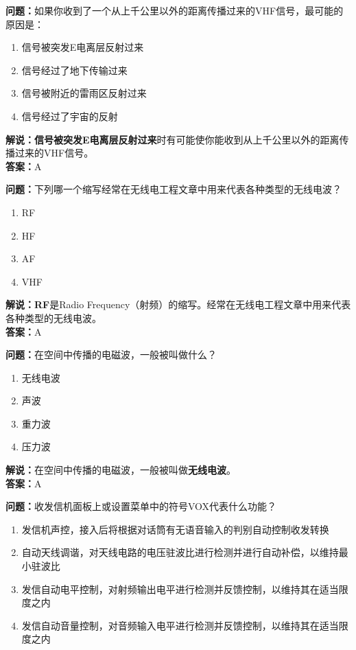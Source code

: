 \textbf{问题：}如果你收到了一个从上千公里以外的距离传播过来的VHF信号，最可能的原因是：

\begin{enumerate}[label=\Alph*), leftmargin=1cm]
	\item 信号被突发E电离层反射过来
	\item 信号经过了地下传输过来
	\item 信号被附近的雷雨区反射过来
	\item 信号经过了宇宙的反射
\end{enumerate}

\textbf{解说：信号被突发E电离层反射过来}时有可能使你能收到从上千公里以外的距离传播过来的VHF信号。\\\textbf{答案：}A



\textbf{问题：}下列哪一个缩写经常在无线电工程文章中用来代表各种类型的无线电波？

\begin{enumerate}[label=\Alph*), leftmargin=1cm]
	\item RF
	\item HF
	\item AF
	\item VHF
\end{enumerate}

\textbf{解说：RF}是Radio Frequency（射频）的缩写。经常在无线电工程文章中用来代表各种类型的无线电波。\\\textbf{答案：}A



\textbf{问题：}在空间中传播的电磁波，一般被叫做什么？

\begin{enumerate}[label=\Alph*), leftmargin=1cm]
	\item 无线电波
	\item 声波
	\item 重力波
	\item 压力波
\end{enumerate}

\textbf{解说：}在空间中传播的电磁波，一般被叫做\textbf{无线电波}。\\\textbf{答案：}A%



\textbf{问题：}收发信机面板上或设置菜单中的符号VOX代表什么功能？

\begin{enumerate}[label=\Alph*), leftmargin=1cm]
	\item 发信机声控，接入后将根据对话筒有无语音输入的判别自动控制收发转换
	\item 自动天线调谐，对天线电路的电压驻波比进行检测并进行自动补偿，以维持最小驻波比
	\item 发信自动电平控制，对射频输出电平进行检测并反馈控制，以维持其在适当限度之内
	\item 发信自动音量控制，对音频输入电平进行检测并反馈控制，以维持其在适当限度之内
\end{enumerate}

